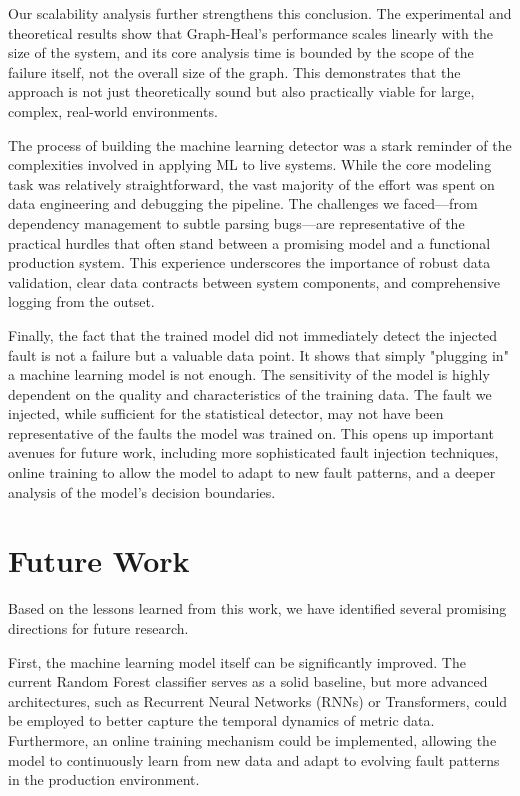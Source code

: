 \documentclass[11pt,conference]{IEEEtran}
\begin{document}
Our scalability analysis further strengthens this conclusion. The experimental and theoretical results show that Graph-Heal's performance scales linearly with the size of the system, and its core analysis time is bounded by the scope of the failure itself, not the overall size of the graph. This demonstrates that the approach is not just theoretically sound but also practically viable for large, complex, real-world environments.

The process of building the machine learning detector was a stark reminder of the complexities involved in applying ML to live systems. While the core modeling task was relatively straightforward, the vast majority of the effort was spent on data engineering and debugging the pipeline. The challenges we faced—from dependency management to subtle parsing bugs—are representative of the practical hurdles that often stand between a promising model and a functional production system. This experience underscores the importance of robust data validation, clear data contracts between system components, and comprehensive logging from the outset.

Finally, the fact that the trained model did not immediately detect the injected fault is not a failure but a valuable data point. It shows that simply "plugging in" a machine learning model is not enough. The sensitivity of the model is highly dependent on the quality and characteristics of the training data. The fault we injected, while sufficient for the statistical detector, may not have been representative of the faults the model was trained on. This opens up important avenues for future work, including more sophisticated fault injection techniques, online training to allow the model to adapt to new fault patterns, and a deeper analysis of the model's decision boundaries.

\section{Future Work}
\label{sec:future-work}
Based on the lessons learned from this work, we have identified several promising directions for future research.

First, the machine learning model itself can be significantly improved. The current Random Forest classifier serves as a solid baseline, but more advanced architectures, such as Recurrent Neural Networks (RNNs) or Transformers, could be employed to better capture the temporal dynamics of metric data. Furthermore, an online training mechanism could be implemented, allowing the model to continuously learn from new data and adapt to evolving fault patterns in the production environment.
\end{document}
